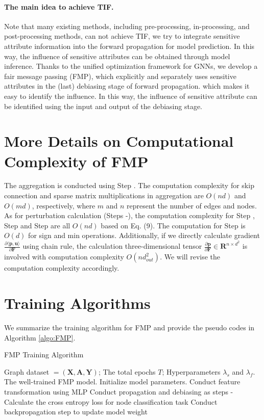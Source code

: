 \documentclass[letterpaper]{article} %
\theoremstyle{plain}
\theoremstyle{definition}
\theoremstyle{remark}
\begin{document}
\paragraph{The main idea to achieve TIF.} Note that many existing methods, including pre-processing, in-processing, and post-processing methods, can not achieve TIF, we try to integrate sensitive attribute information into the forward propagation for model prediction. In this way, the influence of sensitive attributes can be obtained through model inference. Thanks to the unified optimization framework for GNNs, we develop a fair message passing (FMP), which explicitly and separately uses sensitive attributes in the (last) debiasing stage of forward propagation. which makes it easy to identify the influence. In this way,  the influence of sensitive attribute can be identified using the input and output of the debiasing stage.

\section{More Details on Computational Complexity of FMP}
The aggregation is conducted using Step \textbf{}. The computation complexity for skip connection and sparse matrix multiplications in aggregation are $O(nd)$ and $O(md)$, respectively, where $m$ and $n$ represent the number of edges and nodes. As for perturbation calculation (Steps \textbf{}-\textbf{}), the computation complexity for Step \textbf{}, Step \textbf{} and Step \textbf{} are all $O(nd)$ based on Eq. (9). The computation for Step \textbf{} is $O(d)$ for sign and min operations. Additionally, if we directly calculate gradient $\frac{\partial \langle \mathbf{p}, \mathbf{u}\rangle}{\partial \mathbf{F}}$ using chain rule, the calculation three-dimensional tensor $\frac{\partial \mathbf{p}}{\partial \mathbf{F}}\in \mathbf{R}^{n\times d^2}$ is involved with computation complexity $O(nd_{out}^2)$. We will revise the computation complexity accordingly.

\section{Training Algorithms}
We summarize the training algorithm for FMP and provide the pseudo codes in Algorithm \ref{algo:FMP}.

\begin{algorithm}[htb]
   \caption{FMP Training Algorithm}
   \label{algo:FMP}
\begin{algorithmic}
    Graph dataset $\mathcal=(\mathbf{X}, \mathbf{A}, \mathbf{Y})$; The total epochs $T$; Hyperparameters $\lambda_{s}$ and $\lambda_{f}$.
    The well-trained FMP model.
   \STATE Initialize model parameters.
   \STATE Conduct feature transformation using MLP
   \STATE Conduct propagation and debiasing as steps \textbf{}-\textbf{}
    \STATE Calculate the cross entropy loss for node classification task
    \STATE Conduct backpropagation step to update model weight
   \ENDFOR
\end{algorithmic}
\end{algorithm}
\end{document}
